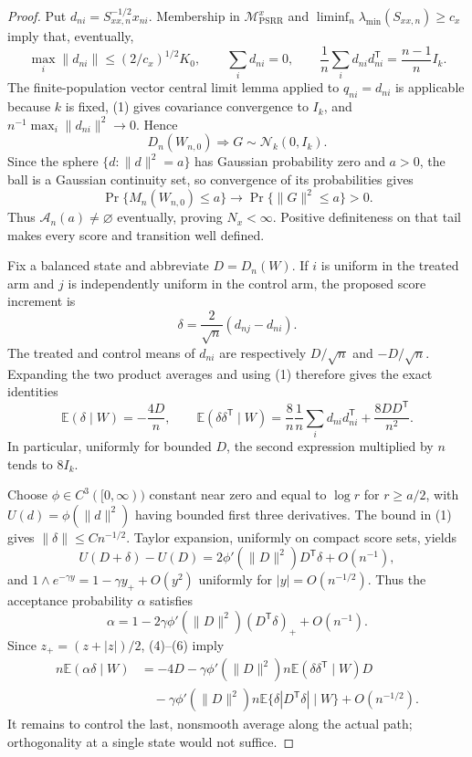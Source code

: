 \documentclass{article}
\begin{document}
\begin{proof}
Put \(d_{ni}=S_{xx,n}^{-1/2}x_{ni}\).  Membership in \(\mathcal M_{\mathrm{PSRR}}^{x}\) and \(\liminf_n\lambda_{\min}(S_{xx,n})\ge c_x\) imply that, eventually,
\[
 \max_i\|d_{ni}\|\le (2/c_x)^{1/2}K_0,
 \qquad \sum_i d_{ni}=0,
 \qquad \frac1n\sum_i d_{ni}d_{ni}^{\mathsf T}=\frac{n-1}{n}I_k. \tag{1}
\]
The finite-population vector central limit lemma applied to \(q_{ni}=d_{ni}\) is applicable because \(k\) is fixed, (1) gives covariance convergence to \(I_k\), and \(n^{-1}\max_i\|d_{ni}\|^2\to0\).  Hence
\[
 D_n(W_{n,0})\Rightarrow G\sim\mathcal N_k(0,I_k). \tag{2}
\]
Since the sphere \(\{d:\|d\|^2=a\}\) has Gaussian probability zero and \(a>0\), the ball is a Gaussian continuity set, so convergence of its probabilities gives
\[
 \Pr\{M_n(W_{n,0})\le a\}\longrightarrow\Pr\{\|G\|^2\le a\}>0. \tag{3}
\]
Thus \(\mathcal A_n(a)\ne\varnothing\) eventually, proving \(N_x<\infty\).  Positive definiteness on that tail makes every score and transition well defined.

Fix a balanced state and abbreviate \(D=D_n(W)\).  If \(i\) is uniform in the treated arm and \(j\) is independently uniform in the control arm, the proposed score increment is
\[
 \delta=\frac{2}{\sqrt n}(d_{nj}-d_{ni}).
\]
The treated and control means of \(d_{ni}\) are respectively \(D/\sqrt n\) and \(-D/\sqrt n\).  Expanding the two product averages and using (1) therefore gives the exact identities
\[
 \mathbb E(\delta\mid W)=-\frac{4D}{n},
 \qquad
 \mathbb E(\delta\delta^{\mathsf T}\mid W)
 =\frac{8}{n}\frac1n\sum_i d_{ni}d_{ni}^{\mathsf T}+\frac{8DD^{\mathsf T}}{n^2}. \tag{4}
\]
In particular, uniformly for bounded \(D\), the second expression multiplied by \(n\) tends to \(8I_k\).

Choose \(\phi\in C^3([0,\infty))\) constant near zero and equal to \(\log r\) for \(r\ge a/2\), with \(U(d)=\phi(\|d\|^2)\) having bounded first three derivatives.  The bound in (1) gives \(\|\delta\|\le Cn^{-1/2}\).  Taylor expansion, uniformly on compact score sets, yields
\[
 U(D+\delta)-U(D)=2\phi'(\|D\|^2)D^{\mathsf T}\delta+O(n^{-1}), \tag{5}
\]
and \(1\wedge e^{-\gamma y}=1-\gamma y_++O(y^2)\) uniformly for \(|y|=O(n^{-1/2})\).  Thus the acceptance probability \(\alpha\) satisfies
\[
 \alpha=1-2\gamma\phi'(\|D\|^2)(D^{\mathsf T}\delta)_++O(n^{-1}). \tag{6}
\]
Since \(z_+=(z+|z|)/2\), (4)--(6) imply
\[
 \begin{split}
 n\mathbb E(\alpha\delta\mid W)
 &=-4D-\gamma\phi'(\|D\|^2)n\mathbb E(\delta\delta^{\mathsf T}\mid W)D\\
 &\quad-\gamma\phi'(\|D\|^2)n\mathbb E\{\delta|D^{\mathsf T}\delta|\mid W\}+O(n^{-1/2}).
 \end{split} \tag{7}
\]
It remains to control the last, nonsmooth average along the actual path; orthogonality at a single state would not suffice.


\end{proof}
\end{document}
